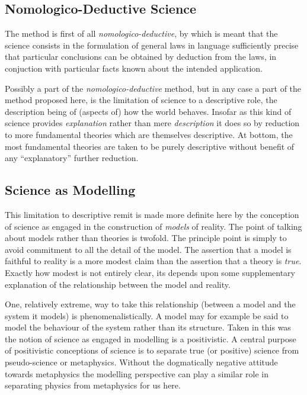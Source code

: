 \documentclass{rbjk}
\begin{document}
\begin{article}
\subsection{Nomologico-Deductive Science}

The method is first of all {\it nomologico-deductive}, by which is meant that the science consists in the formulation of general laws in language sufficiently precise that particular conclusions can be obtained by deduction from the laws, in conjuction with particular facts known about the intended application.

Possibly a part of the  {\it nomologico-deductive} method, but in any case a part of the method proposed here, is the limitation of science to a descriptive role, the description being of (aspects of) how the world behaves.
Insofar as this kind of science provides {\it explanation} rather than mere {\it description} it does so by reduction to more fundamental theories which are themselves descriptive.
At bottom, the most fundamental theories are taken to be purely descriptive without benefit of any ``explanatory'' further reduction.

\subsection{Science as Modelling}

This limitation to descriptive remit is made more definite here by the conception of science as engaged in the construction of {\it models} of reality.
The point of talking about models rather than theories is twofold.
The principle point is simply to avoid commitment to all the detail of the model.
The assertion that a model is faithful to reality is a more modest claim than the assertion that a theory is {\it true}.
Exactly how modest is not entirely clear, its depends upon some supplementary explanation of the relationship between the model and reality.

One, relatively extreme, way to take this relationship (between a model and the system it models) is phenomenalistically.
A model may for example be said to model the behaviour of the system rather than its structure.
Taken in this was the notion of science as engaged in modelling is a positivistic.
A central purpose of positivistic conceptions of science is to separate true (or positive) science from pseudo-science or metaphysics.
Without the dogmatically negative attitude towards metaphysics the modelling perspective can play a similar role in separating physics from metaphysics for us here.


\end{article}
\end{document}
